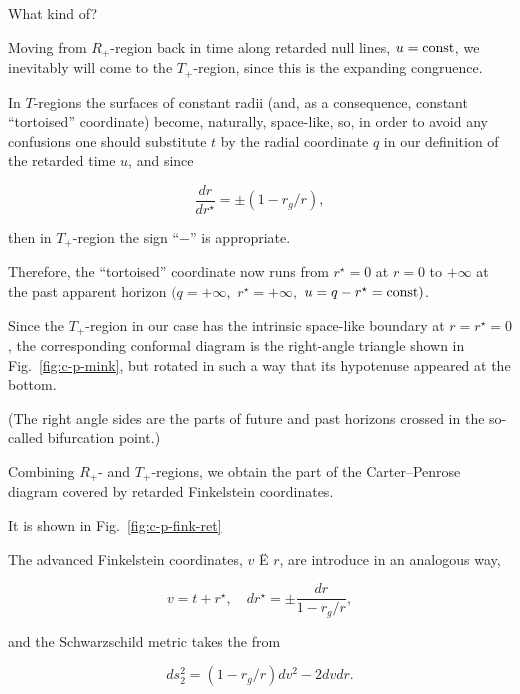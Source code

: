 What kind of? 

Moving from $R_+$-region back in time along retarded null lines, $u = \rm const$, we inevitably will come to the $T_+$-region, since this is the expanding congruence. 

In $T$-regions the surfaces of constant radii (and, as a consequence, constant ``tortoised'' coordinate) become, naturally, space-like, so, in order to avoid any confusions one should substitute $t$ by the radial coordinate $q$ in our definition of the retarded time $u$, and since 

$$

\frac{dr}{dr^{\star}} = \pm \left(1 - {r_g}/{r} \right),

$$ 

then in $T_+$-region the sign ``$-$'' is appropriate. 

Therefore, the ``tortoised'' coordinate now runs from $r^{\star} = 0$ at $r = 0$ to $+\infty$ at the past apparent horizon $({q = +\infty},$ $ r^{\star} = +\infty,$ $ u = q - r^{\star} = \rm const)$. 

Since the $T_+$-region in our case has the intrinsic space-like boundary at $r = r^{\star} = 0$, the corresponding conformal diagram is the right-angle triangle shown in Fig.~\ref{fig:c-p-mink}, but rotated in such a way that its hypotenuse appeared at the bottom. 

(The right angle sides are the parts of future and past horizons crossed in the so-called bifurcation point.) 

Combining $R_+$- and $T_+$-regions, we obtain the part of the Carter--Penrose diagram covered by retarded Finkelstein coordinates. 

It is shown in Fig.~\ref{fig:c-p-fink-ret}

The advanced Finkelstein coordinates, $v$ Ë $r$, are introduce in an analogous way,

\begin{equation}

\label{finadv}

v = t + r^{\star} , \quad  dr^{\star} = \pm \frac{dr}{1 - {r_g}/{r}} ,

\end{equation}

and the Schwarzschild metric takes the from

\begin{equation}

\label{advschw}

ds_2^2 = \left(1 - {r_g}/{r} \right) dv^2 - 2 dv dr .

\end{equation}

